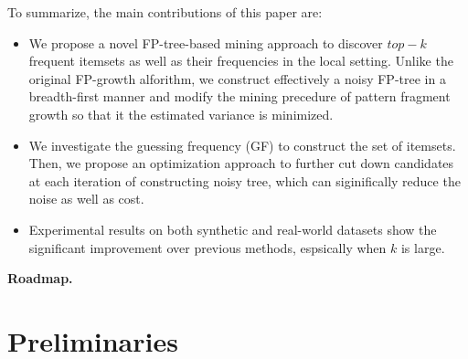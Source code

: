 \documentclass[conference]{IEEEtran}
\begin{document}
{\color{red}
To summarize, the main contributions of this paper are:
\begin{itemize}




\item We propose a novel FP-tree-based mining approach to discover $top-k$ frequent itemsets as well as their frequencies in the local setting. Unlike the original FP-growth alforithm, we construct effectively a noisy FP-tree in a breadth-first manner and modify the mining precedure of pattern fragment growth so that it the estimated variance is minimized.

\item We investigate the guessing frequency (GF) to construct the set of itemsets. Then, we propose an optimization approach to further cut down candidates at each iteration of constructing noisy tree, which can siginifically reduce the noise as well as cost.

\item Experimental results on both synthetic and real-world datasets show the significant improvement over previous methods, espsically when $k$ is large.
\end{itemize}
}


\textbf{Roadmap.}

\section{Preliminaries}
\end{document}
